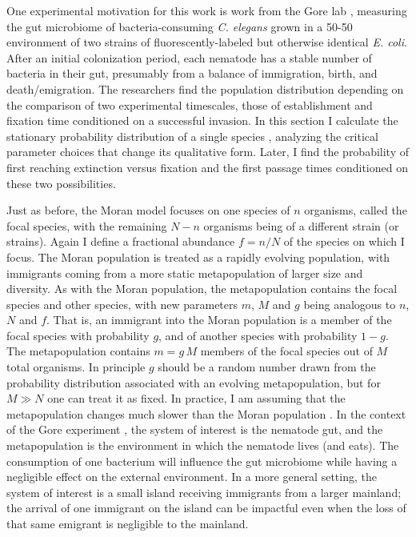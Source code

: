 One experimental motivation for this work is work from the Gore lab \cite{Vega2017}, measuring the gut microbiome of bacteria-consuming \emph{C. elegans} grown in a 50-50 environment of two strains of fluorescently-labeled but otherwise identical \emph{E. coli}. 
After an initial colonization period, each nematode has a stable number of bacteria in their gut, presumably from a balance of immigration, birth, and death/emigration. 
The researchers find the population distribution depending on the comparison of two experimental timescales, those of establishment and fixation time conditioned on a successful invasion. 
In this section I calculate the stationary probability distribution of a single species \cite{McKane2004b}, analyzing the critical parameter choices that change its qualitative form. 
Later, I find the probability of first reaching extinction versus fixation and the first passage times conditioned on these two possibilities. 

Just as before, the Moran model focuses on one species of $n$ organisms, called the focal species, with the remaining $N-n$ organisms being of a different strain (or strains). 
Again I define a fractional abundance $f=n/N$ of the species on which I focus. 
The Moran population is treated as a rapidly evolving population, with immigrants coming from a more static metapopulation of larger size and diversity. 
As with the Moran population, the metapopulation contains the focal species and other species, with new parameters $m$, $M$ and $g$ being analogous to $n$, $N$ and $f$. 
That is, an immigrant into the Moran population is a member of the focal species with probability $g$, and of another species with probability $1-g$. 
The metapopulation contains $m = g\,M$ members of the focal species out of $M$ total organisms. 
In principle $g$ should be a random number drawn from the probability distribution associated with an evolving metapopulation, but for $M\gg N$ one can treat it as fixed. 
In practice, I am assuming that the metapopulation changes much slower than the Moran population \cite{McKane2004b}. %
In the context of the Gore experiment \cite{Vega2017}, the system of interest is the nematode gut, and the metapopulation is the environment in which the nematode lives (and eats). 
The consumption of one bacterium will influence the gut microbiome while having a negligible effect on the external environment. 
In a more general setting, the system of interest is a small island receiving immigrants from a larger mainland; the arrival of one immigrant on the island can be impactful even when the loss of that same emigrant is negligible to the mainland. 

